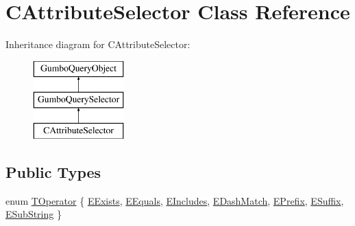 \hypertarget{class_c_attribute_selector}{}\section{C\+Attribute\+Selector Class Reference}
\label{class_c_attribute_selector}
Inheritance diagram for C\+Attribute\+Selector\+:\begin{figure}[H]
\begin{center}
\leavevmode
\includegraphics[height=3.000000cm]{class_c_attribute_selector}
\end{center}
\end{figure}
\subsection*{Public Types}
\begin{DoxyCompactItemize}
\item 
enum \mbox{\hyperlink{class_c_attribute_selector_ae0950894fd715af728d5a5c4621bf44d}{T\+Operator}} \{ \newline
\mbox{\hyperlink{class_c_attribute_selector_ae0950894fd715af728d5a5c4621bf44da75b5c40ea0fbcf014bf900674e56b581}{E\+Exists}}, 
\mbox{\hyperlink{class_c_attribute_selector_ae0950894fd715af728d5a5c4621bf44da7b3bd5911fed89bddae3178158967acf}{E\+Equals}}, 
\mbox{\hyperlink{class_c_attribute_selector_ae0950894fd715af728d5a5c4621bf44da2a6c1502443c79801656539c86fbde73}{E\+Includes}}, 
\mbox{\hyperlink{class_c_attribute_selector_ae0950894fd715af728d5a5c4621bf44dadf5410ac7e1eedb558c21b2c20b65d0d}{E\+Dash\+Match}}, 
\newline
\mbox{\hyperlink{class_c_attribute_selector_ae0950894fd715af728d5a5c4621bf44da57a3bd166e2c1da7dd7472ce23636203}{E\+Prefix}}, 
\mbox{\hyperlink{class_c_attribute_selector_ae0950894fd715af728d5a5c4621bf44da496c6a55d2ca0ea273def788f132b091}{E\+Suffix}}, 
\mbox{\hyperlink{class_c_attribute_selector_ae0950894fd715af728d5a5c4621bf44daa792f945d982ebb1e00ad7d62d21e48f}{E\+Sub\+String}}
 \}
\end{DoxyCompactItemize}
